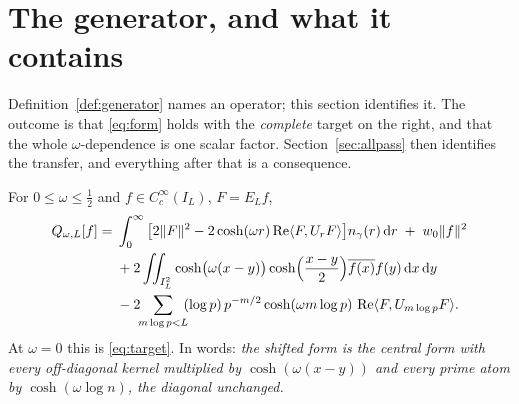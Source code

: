 \section{The generator, and what it contains}\label{sec:generator}

Definition~\ref{def:generator} names an operator; this section identifies it. The
outcome is that \eqref{eq:form} holds with the \emph{complete} target on the right,
and that the whole $\omega$-dependence is one scalar factor. Section~\ref{sec:allpass}
then identifies the transfer, and everything after that is a consequence.

\begin{theorem}\label{thm:kernel}
For $0\leq\omega\leq\frac12$ and $f\in C_c^\infty(I_L)$, $F=E_Lf$,
\begin{align}
 Q_{\omega,L}[f]
 ={}&\int_0^\infty\big[2\lVert F\rVert^2-2\cosh(\omega r)\operatorname{Re}\langle F,U_rF\rangle\big]
      n_{\gamma}(r)\,\mathrm d r
   \;+\;w_0\lVert f\rVert^2 \notag\\
  &+2\iint_{I_L^2}\cosh\!\big(\omega(x-y)\big)
      \cosh\!\Big(\frac{x-y}2\Big)\overline{f(x)}f(y)\,\mathrm d x\,\mathrm d y \notag\\
  &-2\!\!\sum_{m\log p<L}\!\!(\log p)\,p^{-m/2}\cosh(\omega m\log p)\,
      \operatorname{Re}\langle F,U_{m\log p}F\rangle .
 \label{eq:shifted-target}
\end{align}
At $\omega=0$ this is \eqref{eq:target}. In words: \emph{the shifted form is the
central form with every off-diagonal kernel multiplied by $\cosh(\omega(x-y))$
and every prime atom by $\cosh(\omega\log n)$, the diagonal unchanged.}
\end{theorem}

